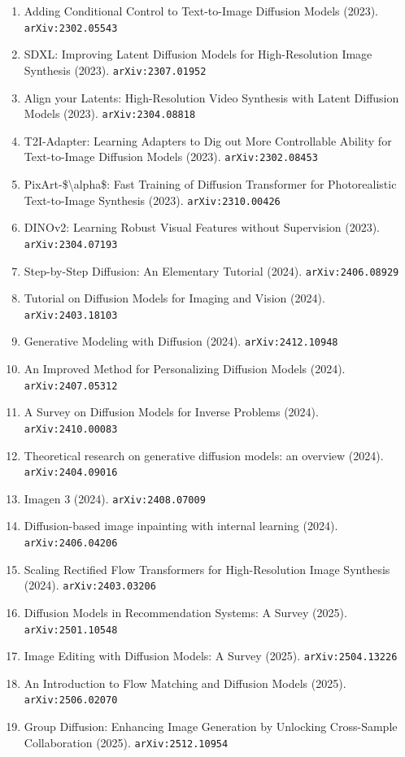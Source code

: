 \documentclass[11pt]{article}
\begin{document}
\begin{enumerate}
  \item Adding Conditional Control to Text-to-Image Diffusion Models (2023). \texttt{arXiv:2302.05543}
  \item SDXL: Improving Latent Diffusion Models for High-Resolution Image Synthesis (2023). \texttt{arXiv:2307.01952}
  \item Align your Latents: High-Resolution Video Synthesis with Latent Diffusion Models (2023). \texttt{arXiv:2304.08818}
  \item T2I-Adapter: Learning Adapters to Dig out More Controllable Ability for Text-to-Image Diffusion Models (2023). \texttt{arXiv:2302.08453}
  \item PixArt-\$\textbackslash{}alpha\$: Fast Training of Diffusion Transformer for Photorealistic Text-to-Image Synthesis (2023). \texttt{arXiv:2310.00426}
  \item DINOv2: Learning Robust Visual Features without Supervision (2023). \texttt{arXiv:2304.07193}
  \item Step-by-Step Diffusion: An Elementary Tutorial (2024). \texttt{arXiv:2406.08929}
  \item Tutorial on Diffusion Models for Imaging and Vision (2024). \texttt{arXiv:2403.18103}
  \item Generative Modeling with Diffusion (2024). \texttt{arXiv:2412.10948}
  \item An Improved Method for Personalizing Diffusion Models (2024). \texttt{arXiv:2407.05312}
  \item A Survey on Diffusion Models for Inverse Problems (2024). \texttt{arXiv:2410.00083}
  \item Theoretical research on generative diffusion models: an overview (2024). \texttt{arXiv:2404.09016}
  \item Imagen 3 (2024). \texttt{arXiv:2408.07009}
  \item Diffusion-based image inpainting with internal learning (2024). \texttt{arXiv:2406.04206}
  \item Scaling Rectified Flow Transformers for High-Resolution Image Synthesis (2024). \texttt{arXiv:2403.03206}
  \item Diffusion Models in Recommendation Systems: A Survey (2025). \texttt{arXiv:2501.10548}
  \item Image Editing with Diffusion Models: A Survey (2025). \texttt{arXiv:2504.13226}
  \item An Introduction to Flow Matching and Diffusion Models (2025). \texttt{arXiv:2506.02070}
  \item Group Diffusion: Enhancing Image Generation by Unlocking Cross-Sample Collaboration (2025). \texttt{arXiv:2512.10954}

\end{enumerate}
\end{document}
